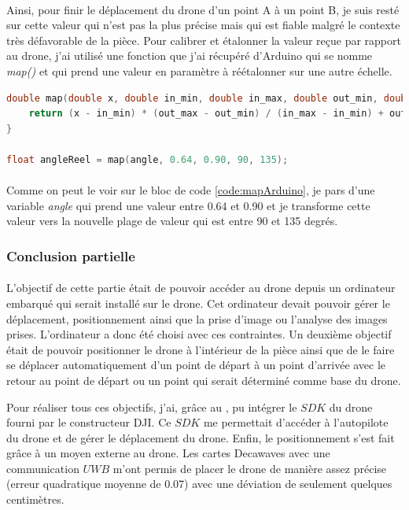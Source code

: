         
        \paragraph*{}
        Ainsi, pour finir le déplacement du drone d'un point A à un point B, je suis resté sur cette valeur qui n'est pas la plus précise mais qui est fiable malgré le contexte très défavorable de la pièce. Pour calibrer et étalonner la valeur reçue par rapport au drone, j'ai utilisé une fonction que j'ai récupéré d'Arduino qui se nomme \textit{map()} et qui prend une valeur en paramètre à réétalonner sur une autre échelle.
        
        \begin{lstlisting}[language=C++, caption=Exemple fonction map, label=code:mapArduino]
double map(double x, double in_min, double in_max, double out_min, double out_max){
	return (x - in_min) * (out_max - out_min) / (in_max - in_min) + out_min;
}
        
float angleReel = map(angle, 0.64, 0.90, 90, 135);\end{lstlisting}
        
        \paragraph*{}
        Comme on peut le voir sur le bloc de code \ref{code:mapArduino}, je pars d'une variable \textit{angle} qui prend une valeur entre 0.64 et 0.90 et je transforme cette valeur vers la nouvelle plage de valeur qui est entre 90 et 135 degrés.
        
        
    \subsubsection{Conclusion partielle}
        \paragraph*{}
        L'objectif de cette partie était de pouvoir accéder au drone depuis un ordinateur embarqué qui serait installé sur le drone. Cet ordinateur devait pouvoir gérer le déplacement, positionnement ainsi que la prise d'image ou l'analyse des images prises. L'ordinateur a donc été choisi avec ces contraintes. Un deuxième objectif était de pouvoir positionner le drone à l'intérieur de la pièce ainsi que de le faire se déplacer automatiquement d'un point de départ à un point d'arrivée avec le retour au point de départ ou un point qui serait déterminé comme base du drone.
        
        Pour réaliser tous ces objectifs, j'ai, grâce au \rpi, pu intégrer le $SDK$ du drone fourni par le constructeur DJI. Ce $SDK$ me permettait d'accéder à l'autopilote du drone et de gérer le déplacement du drone. Enfin, le positionnement s'est fait grâce à un moyen externe au drone. Les cartes Decawaves avec une communication $UWB$ m'ont permis de placer le drone de manière assez précise (erreur quadratique moyenne de 0.07) avec une déviation de seulement quelques centimètres.